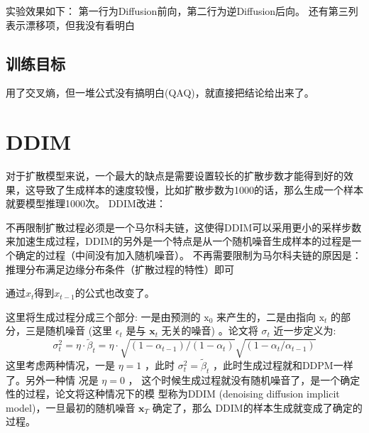 \documentclass[]{ctexart}
\begin{document}
实验效果如下：
第一行为Diffusion前向，第二行为逆Diffusion后向。
还有第三列表示漂移项，但我没有看明白

\subsection{训练目标}

用了交叉熵，但一堆公式没有搞明白(QAQ)，就直接把结论给出来了。

\section{DDIM}
对于扩散模型来说，一个最大的缺点是需要设置较长的扩散步数才能得到好的效果，这导致了生成样本的速度较慢，比如扩散步数为1000的话，那么生成一个样本就要模型推理1000次。
DDIM改进：

不再限制扩散过程必须是一个马尔科夫链，这使得DDIM可以采用更小的采样步数来加速生成过程，DDIM的另外是一个特点是从一个随机噪音生成样本的过程是一个确定的过程（中间没有加入随机噪音）。
不再需要限制为马尔科夫链的原因是：
推理分布满足边缘分布条件（扩散过程的特性）即可

通过$x_t$得到$x_{t-1}$的公式也改变了。

这里将生成过程分成三个部分: 一是由预测的 $\mathrm{x}_0$ 来产生的，二是由指向 $\mathrm{x}_t$ 的部分，三是随机噪音 (这里 $\epsilon_t$ 是与 $\mathbf{x}_t$ 无关的噪音) 。论文将 $\sigma_t$ 近一步定义为:
$$
\sigma_t^2=\eta \cdot \tilde{\beta}_t=\eta \cdot \sqrt{\left(1-\alpha_{t-1}\right) /\left(1-\alpha_t\right)} \sqrt{\left(1-\alpha_t / \alpha_{t-1}\right)}
$$
这里考虑两种情况，一是 $\eta=1$ ，此时 $\sigma_t^2=\tilde{\beta}_t$ ，此时生成过程就和DDPM一样了。另外一种情 况是 $\eta=0$ ，
这个时候生成过程就没有随机噪音了，是一个确定性的过程，论文将这种情况下的模 型称为DDIM (denoising diffusion implicit model)，一旦最初的随机噪音 $\mathbf{x}_T$ 确定了，那么 DDIM的样本生成就变成了确定的过程。
\end{document}

